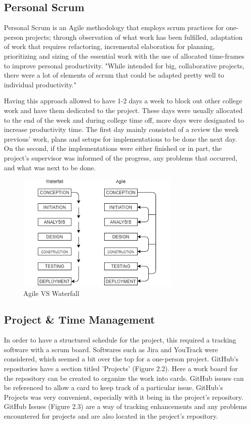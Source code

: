 \subsection{Personal Scrum}
Personal Scrum is an Agile methodology that employs scrum practices for one-person projects; through observation of what work has been fulfilled, adaptation of work that requires refactoring, incremental elaboration for planning, prioritizing and sizing of the essential work with the use of allocated time-frames to improve personal productivity.
"While intended for big, collaborative projects, there were a lot of elements of scrum that could be adapted pretty well to individual productivity." \cite{ref4}
 
Having this approach allowed to have 1-2 days a week to block out other college work and have them dedicated to the project. These days were usually allocated to the end of the week and during college time off, more days were designated to increase productivity time. The first day mainly consisted of a review the week previous' work, plans and setups for implementations to be done the next day. On the second, if the implementations were either finished or in part, the project's supervisor was informed of the progress, any problems that occurred, and what was next to be done.

\begin{figure}[H]
    \caption{Agile VS Waterfall}
    \label{image:agileVSwaterfall}
    \centering
    \includegraphics[width=0.72\textwidth]{images/misc/agile-vs-waterfall.png}
\end{figure}

\subsection{Project \& Time Management}
In order to have a structured schedule for the project, this required a tracking software with a scrum board. Softwares such as Jira and YouTrack were considered, which seemed a bit over the top for a one-person project. GitHub's repositories have a section titled 'Projects' (Figure 2.2). Here a work board for the repository can be created to organize the work into cards. GitHub issues can be referenced to allow a card to keep track of a particular issue. GitHub's Projects was very convenient, especially with it being in the project's repository. GitHub Issues (Figure 2.3) are a way of tracking enhancements and any problems encountered for projects and are also located in the project's repository.

